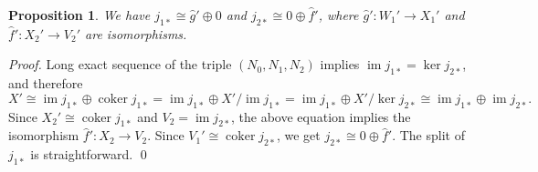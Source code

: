 \documentclass[letterpaper,11pt]{article}
\theoremstyle{plain}
\newtheorem{proposition}[theorem]{Proposition}
\theoremstyle{definition}
\newcommand{\im}{\operatorname{im}}
\newcommand{\coker}{\operatorname{coker}}
\newcounter{li}
\newcommand{\Zgroup}{\mathsf{Z}}
\newcommand{\Cgroup}{\mathsf{C}}
\newcommand{\lmap}[1]{\iota_{#1}}
\newcommand{\lmapx}[1]{\iota_{#1\ast}}
\newcommand{\imapx}[1]{j_{#1\ast}}
\newcommand{\projmapx}[1]{\pi_{#1\ast}}
\begin{document}
{    %


\begin{proposition}\label{prop:B-to-B2-splits-into-0-f}
    We have $\imapx{1}\cong \hat{g}'\oplus 0$ and $\imapx{2}\cong 0\oplus \hat{f}'$, 
        where $\hat{g}':W_1'\rightarrow X_1'$ and $\hat{f}':X_2'\rightarrow V_2'$ are isomorphisms.  
\end{proposition}
\begin{proof}
	Long exact sequence of the triple $(N_0, N_1, N_2)$ implies $\im \imapx{1} = \ker \imapx{2}$, and therefore  
	\begin{equation*}
		X' \cong \im\imapx{1}\oplus\coker \imapx{1} 
			= \im\imapx{1}\oplus X'/\im \imapx{1} 
			= \im\imapx{1}\oplus X'/\ker \imapx{2}
			\cong \im\imapx{1}\oplus\im \imapx{2}.
	\end{equation*}
	Since $X_2'\cong\coker \imapx{1}$ and $V_2=\im \imapx{2}$, the above equation implies the isomorphism 
        $\hat{f}': X_2\rightarrow V_2$.
	Since $V_1'\cong\coker \imapx{2}$, we get $\imapx{2} \cong 0\oplus \hat{f}'$.
    The split of $\imapx{1}$ is straightforward.
    \qed
\end{proof}

}
\end{document}
